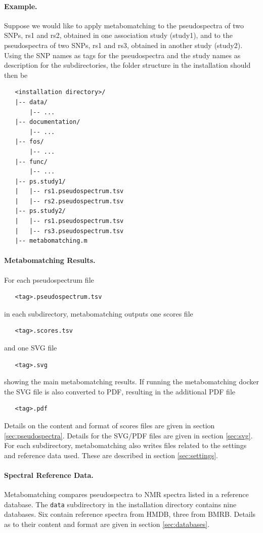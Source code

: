 \documentclass[a4paper,11pt]{article}
\begin{document}
\paragraph{Example.} Suppose we would like to apply metabomatching to the pseudospectra of two SNPs, rs1 and rs2, obtained in one association study (study1), and to the pseudospectra of two SNPs, rs1 and rs3, obtained in another study (study2). Using the SNP names as tags for the pseudospectra and the study names as description for the subdirectories, the folder structure in the installation should then be
\begin{verbatim}
   <installation directory>/
   |-- data/
       |-- ...
   |-- documentation/
       |-- ...
   |-- fos/
       |-- ...
   |-- func/
       |-- ...
   |-- ps.study1/
   |   |-- rs1.pseudospectrum.tsv
   |   |-- rs2.pseudospectrum.tsv
   |-- ps.study2/
   |   |-- rs1.pseudospectrum.tsv
   |   |-- rs3.pseudospectrum.tsv
   |-- metabomatching.m
\end{verbatim}
\paragraph{Metabomatching Results.} For each pseudospectrum file
\begin{verbatim}
   <tag>.pseudospectrum.tsv
\end{verbatim}
in each subdirectory, metabomatching outputs one scores file 
\begin{verbatim}
   <tag>.scores.tsv
\end{verbatim}
and one SVG file
\begin{verbatim}
   <tag>.svg
\end{verbatim}
showing the main metabomatching results. If running the metabomatching docker the SVG file is also converted to PDF, resulting in the additional PDF file
\begin{verbatim}
   <tag>.pdf
\end{verbatim}
 Details on the content and format of scores files are given in section \ref{sec:pseudospectra}. Details for the SVG/PDF files are given in section \ref{sec:svg}. For each subdirectory, metabomatching also writes files related to the settings and reference data used. These are described in section \ref{sec:settings}.
\paragraph{Spectral Reference Data.} Metabomatching compares pseudospectra to NMR spectra listed in a reference database. The \verb|data| subdirectory in the installation directory contains nine databases. Six contain reference spectra from HMDB, three from BMRB. Details as to their content and format are given in section \ref{sec:databases}.
\end{document}
